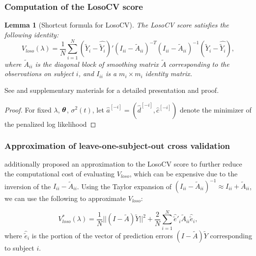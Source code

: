 \documentclass[12pt]{article}
\newcommand{\tildeY}{\tilde{Y}}
\newcommand{\tildeA}{\tilde{A}}
\newcommand{\bftheta}{\mbox{\boldmath $\theta$}}
\newtheorem{lemma}[theorem]{Lemma}
\theoremstyle{definition}
\begin{document}
  \subsubsection{Computation of the LosoCV score}
  
  \begin{lemma}[Shortcut formula for LosoCV] \label{lemma:losocv-shortcut}
  The LosoCV score satisfies the following identity:
  \begin{equation*}
 V_{loso}\left( \lambda \right) = \frac{1}{N} \sum_{i = 1}^N \left(\tildeY_i - \widehat{\tildeY_i}\right)' \left(I_{ii} - \tildeA_{ii}\right)^{-T}\left(I_{ii} - \tildeA_{ii}\right)^{-1}\left(\tildeY_i - \widehat{\tildeY_i}\right),
  \end{equation*}
  \noindent
  where $\tildeA_{ii}$ is the diagonal block of smoothing matrix $\tildeA$ corresponding to the observations on subject $i$, and $I_{ii}$ is a $m_i \times m_i$ identity matrix.
\end{lemma}

See \citet{xu2012asymptotic} and supplementary materials \citet{xuasymptotic} for a detailed presentation and proof.  

\begin{proof} \label{proof:losocv-shortcut}
For fixed $\lambda$, $\bftheta$, $\sigma^2\left(t \right)$, let $\hat{a}^{\left[-i\right]} = \left(\hat{d}^{\left[-i\right]}, \hat{c}^{\left[-i\right]}\right)$ denote the minimizer of the penalized log likelihood 
\end{proof}  

\subsubsection{Approximation of leave-one-subject-out cross validation}
  
\citet{xu2012asymptotic} additionally proposed an approximation to the LosoCV score to further reduce the computational cost of evaluating $V_{loso}$, which can be expensive due to the inversion of the $I_{ii} - \tildeA_{ii}$. Using the Taylor expansion of $\left(I_{ii} - \tildeA_{ii}\right)^{-1} \approx I_{ii} + \tildeA_{ii}$, we can use the following to approximate $V_{loso}$:

\begin{equation} \label{eq:approx-losocv}
V_{loso}^*\left( \lambda \right) = \frac{1}{N} \vert \vert \left(I - \tildeA\right)\tildeY \vert \vert^2 + \frac{2}{N} \sum_{i = 1}^N \hat{\tilde{e}}'_{i}\tildeA_{ii}\hat{\tilde{e}}_i,
\end{equation}
\noindent
where $\hat{\tilde{e}}_i$ is the portion of the vector of prediction errors $\left(I - \tildeA\right)\tildeY$ corresponding to subject $i$.   
\end{document}
